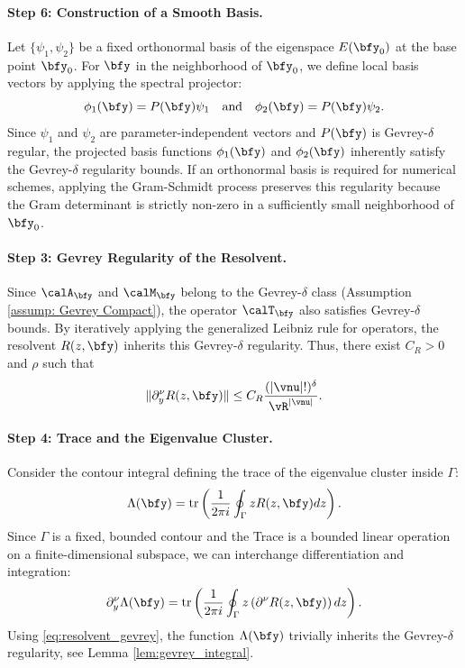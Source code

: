

    \paragraph{Step 6: Construction of a Smooth Basis.} 
Let $\{ \psi_1, \psi_2 \}$ be a fixed orthonormal basis of the eigenspace $E(\bfy_0)$ at the base point $\bfy_0$. For $\bfy$ in the neighborhood of $\bfy_0$, we define local basis vectors by applying the spectral projector:
\begin{equation}
    \phi_1(\bfy) = P(\bfy) \psi_1 \quad \text{and} \quad \phi_2(\bfy) = P(\bfy) \psi_2.
\end{equation}
Since $\psi_1$ and $\psi_2$ are parameter-independent vectors and $P(\bfy)$ is Gevrey-$\delta$ regular, the projected basis functions $\phi_1(\bfy)$ and $\phi_2(\bfy)$ inherently satisfy the Gevrey-$\delta$ regularity bounds. If an orthonormal basis is required for numerical schemes, applying the Gram-Schmidt process preserves this regularity because the Gram determinant is strictly non-zero in a sufficiently small neighborhood of $\bfy_0$.



\paragraph{Step 3: Gevrey Regularity of the Resolvent.}
Since $\calA_{\bfy}$ and $\calM_{\bfy}$ belong to the Gevrey-$\delta$ class (Assumption \ref{assump: Gevrey Compact}), the operator $\calT_{\bfy}$ also satisfies Gevrey-$\delta$ bounds. By iteratively applying the generalized Leibniz rule for operators, the resolvent $R(z,\bfy)$ inherits this Gevrey-$\delta$ regularity. Thus, there exist $C_R > 0$ and $\rho$ such that
\begin{equation} \label{eq:resolvent_gevrey}
    \|\partial^\nu_y R(z,\bfy)\| \le C_R \frac{(|\vnu|!)^\delta}{\vR^{|\vnu|}}.
\end{equation}

\paragraph{Step 4: Trace and the Eigenvalue Cluster.}
Consider the contour integral defining the trace of the eigenvalue cluster inside $\Gamma$:
\begin{equation}
    \Lambda(\bfy) = \mathrm{tr} \left( \frac{1}{2\pi i} \oint_{\Gamma} z R(z,\bfy) dz \right).
\end{equation}
Since $\Gamma$ is a fixed, bounded contour and the Trace is a bounded linear operation on a finite-dimensional subspace, we can interchange differentiation and integration:
\begin{equation}
    \partial^\nu_y \Lambda(\bfy) = \mathrm{tr} \left( \frac{1}{2\pi i} \oint_{\Gamma} z \left( \partial^\nu R(z,\bfy) \right) dz \right).
\end{equation}
Using \eqref{eq:resolvent_gevrey}, the function $\Lambda(\bfy)$ trivially inherits the Gevrey-$\delta$ regularity, see Lemma \ref{lem:gevrey_integral}.



